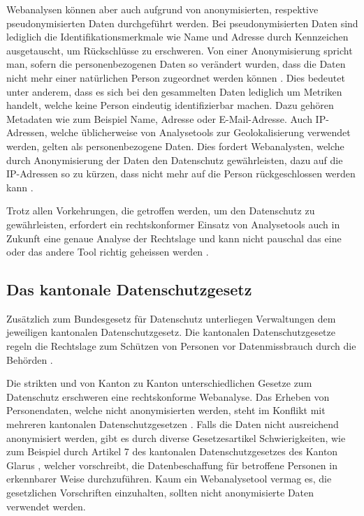 Webanalysen können aber auch aufgrund von anonymisierten, respektive pseudonymisierten Daten durchgeführt werden. Bei pseudonymisierten Daten sind lediglich die Identifikationsmerkmale wie Name und Adresse durch Kennzeichen ausgetauscht, um Rückschlüsse zu erschweren. Von einer Anonymisierung spricht man, sofern die personenbezogenen Daten so verändert wurden, dass die Daten nicht mehr einer natürlichen Person zugeordnet werden können \parencite[S. 3]{EcommerceUndDatenschutz}. Dies bedeutet unter anderem, dass es sich bei den gesammelten Daten lediglich um Metriken handelt, welche keine Person eindeutig identifizierbar machen. Dazu gehören Metadaten wie zum Beispiel Name, Adresse oder E-Mail-Adresse. Auch IP-Adressen, welche üblicherweise von Analysetools zur Geolokalisierung verwendet werden, gelten als personenbezogene Daten. Dies fordert Webanalysten, welche durch Anonymisierung der Daten den Datenschutz gewährleisten, dazu auf die IP-Adressen so zu kürzen, dass nicht mehr auf die Person rückgeschlossen werden kann \parencite[S. 4]{EcommerceUndDatenschutz}.

Trotz allen Vorkehrungen, die getroffen werden, um den Datenschutz zu gewährleisten, erfordert ein rechtskonformer Einsatz von Analysetools auch in Zukunft eine genaue Analyse der Rechtslage und kann nicht pauschal das eine oder das andere Tool richtig geheissen werden \parencite[S. 6]{EcommerceUndDatenschutz}.

\subsection{Das kantonale Datenschutzgesetz}
Zusätzlich zum Bundesgesetz für Datenschutz unterliegen Verwaltungen dem jeweiligen kantonalen Datenschutzgesetz. Die kantonalen Datenschutzgesetze regeln die Rechtslage zum Schützen von Personen vor Datenmissbrauch durch die Behörden \parencite[Vgl. §§ 1 Abs. 1]{DSSGBERN}. 

Die strikten und von Kanton zu Kanton unterschiedlichen Gesetze zum Datenschutz erschweren eine rechtskonforme Webanalyse. Das Erheben von Personendaten, welche nicht anonymisierten werden, steht im Konflikt mit mehreren kantonalen Datenschutzgesetzen \parencite[Vgl. §§ 15 Abs. 1]{DSSGBERN}. Falls die Daten nicht ausreichend anonymisiert werden, gibt es durch diverse Gesetzesartikel Schwierigkeiten, wie zum Beispiel durch Artikel 7 des kantonalen Datenschutzgesetzes des Kanton Glarus \parencite[§§ 7 Abs. 1]{DSSGGL}, welcher vorschreibt, die Datenbeschaffung für betroffene Personen in erkennbarer Weise durchzuführen. Kaum ein Webanalysetool vermag es, die gesetzlichen Vorschriften einzuhalten, sollten nicht anonymisierte Daten verwendet werden.


